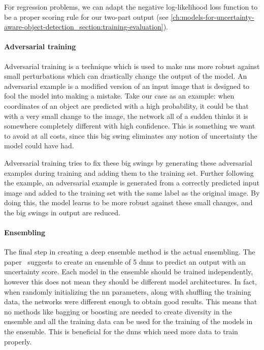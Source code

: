 For regression problems, we can adapt the negative log-likelihood loss function to be a proper scoring rule for our two-part output (see \cref{ch:models-for-uncertainty-aware-object-detection_section:training-evaluation}).

\paragraph{Adversarial training}
Adversarial training is a technique which is used to make \glspl{nn} more robust against small perturbations which can drastically change the output of the model.
An adversarial example is a modified version of an input image that is designed to fool the model into making a mistake.
Take our case as an example: when coordinates of an object are predicted with a high probability, it could be that with a very small change to the image, the network all of a sudden thinks it is somewhere completely different with high confidence.
This is something we want to avoid at all costs, since this big swing eliminates any notion of uncertainty the model could have had.

Adversarial training tries to fix these big swings by generating these adversarial examples during training and adding them to the training set.
Further following the example, an adversarial example is generated from a correctly predicted input image and added to the training set with the same label as the original image.
By doing this, the model learns to be more robust against these small changes, and the big swings in output are reduced.

\paragraph{Ensembling}\label{ch:literature-study_section:uncertainty-aware-ai-models_subsection:deep-ensemble-methods_paragraph:ensembling}
The final step in creating a deep ensemble method is the actual ensembling.
The paper~\cite{src:deep-ensemble-methods} suggests to create an ensemble of 5 \glspl{dnn} to predict an output with an uncertainty score.
Each model in the ensemble should be trained independently, however this does not mean they should be different model architectures.
In fact, when randomly initializing the \gls{nn} parameters, along with shuffling the training data, the networks were different enough to obtain good results.
This means that no methods like bagging or boosting are needed to create diversity in the ensemble and all the training data can be used for the training of the models in the ensemble.
This is beneficial for the \glspl{dnn} which need more data to train properly.

